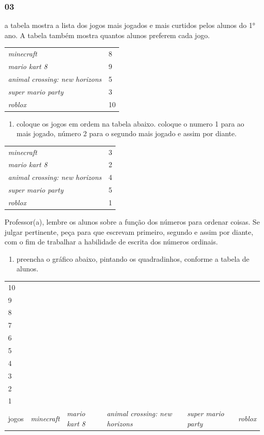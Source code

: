 \subsubsection{03}\label{section-78}

a tabela mostra a lista dos jogos mais jogados e mais curtidos pelos
alunos do 1° ano. A tabela também mostra quantos alunos preferem cada
jogo.

\begin{longtable}[]{@{}ll@{}}
\toprule
\emph{minecraft} & 8\tabularnewline
\emph{mario kart 8} & 9\tabularnewline
\emph{animal crossing: new horizons} & 5\tabularnewline
\emph{super mario party} & 3\tabularnewline
\emph{roblox} & 10\tabularnewline
\bottomrule
\end{longtable}

\begin{enumerate}
\def\labelenumi{\Alph{enumi})}
\item
  coloque os jogos em ordem na tabela abaixo. coloque o numero 1 para ao
  mais jogado, número 2 para o segundo mais jogado e assim por diante.
\end{enumerate}

\begin{longtable}[]{@{}ll@{}}
\toprule
\emph{minecraft} & 3\tabularnewline
\emph{mario kart 8} & 2\tabularnewline
\emph{animal crossing: new horizons} & 4\tabularnewline
\emph{super mario party} & 5\tabularnewline
\emph{roblox} & 1\tabularnewline
\bottomrule
\end{longtable}

Professor(a), lembre os alunos sobre a função dos números para ordenar
coisas. Se julgar pertinente, peça para que escrevam primeiro, segundo e
assim por diante, com o fim de trabalhar a habilidade de escrita dos
números ordinais.

\begin{enumerate}
\def\labelenumi{\Alph{enumi})}
\item
  preencha o gráfico abaixo, pintando os quadradinhos, conforme a tabela
  de alunos.
\end{enumerate}

\begin{longtable}[]{@{}llllll@{}}
\toprule
10 & & & & &\tabularnewline
9 & & & & &\tabularnewline
8 & & & & &\tabularnewline
7 & & & & &\tabularnewline
6 & & & & &\tabularnewline
5 & & & & &\tabularnewline
4 & & & & &\tabularnewline
3 & & & & &\tabularnewline
2 & & & & &\tabularnewline
1 & & & & &\tabularnewline
jogos & \emph{minecraft} & \emph{mario kart 8} & \emph{animal crossing:
new horizons} & \emph{super mario party} & \emph{roblox}\tabularnewline
\bottomrule
\end{longtable}

